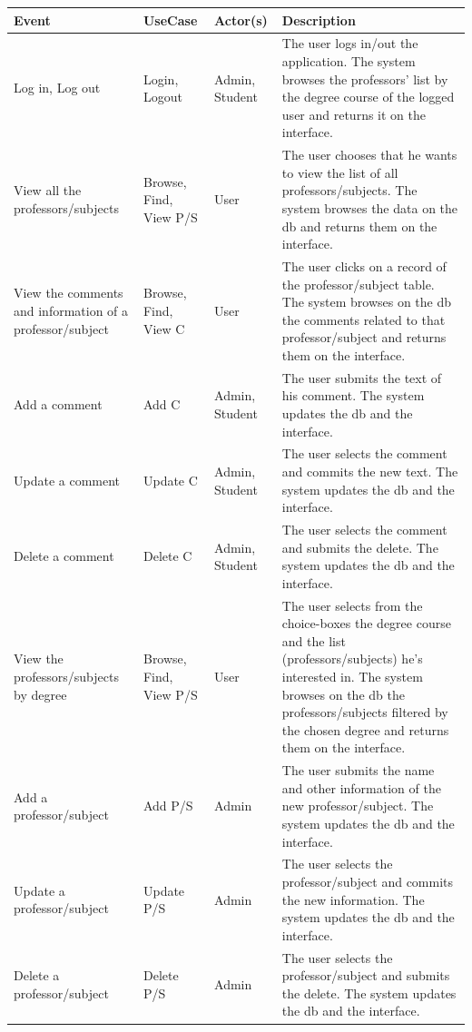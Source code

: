 \documentclass[a4paper, oneside]{article}
\begin{document}
\begin{table}[h]
\centering
\begin{tabular}{p{}p{}lp{}}
\hline
\textbf{Event} & \textbf{UseCase} & \textbf{Actor(s)} & \textbf{Description}\\ \hline
Log in, Log out & Login,  Logout & Admin, Student & The user logs in/out the application. The system browses the professors' list by the degree course of the logged user and returns it on the interface.\\ \hline
View all the professors/subjects & Browse, Find, View P/S & User & The user chooses that he wants to view the list of all professors/subjects. The system browses the data on the db and returns them on the interface.\\ \hline
View the comments and information of a professor/subject & Browse, Find, View C & User & The user clicks on a record of the professor/subject table. The system browses on the db the comments related to that professor/subject and returns them on the interface.\\ \hline
Add a comment & Add C & Admin, Student & The user submits the text of his comment. The system updates the db and the interface.\\ \hline
Update a comment & Update C & Admin, Student & The user selects the comment and commits the new text. The system updates the db and the interface.\\ \hline
Delete a comment & Delete C & Admin, Student & The user selects the comment and submits the delete. The system updates the db and the interface.\\ \hline
View the professors/subjects by degree & Browse, Find, View P/S & User & The user selects from the choice-boxes the degree course and the list (professors/subjects) he's interested in. The system browses on the db the professors/subjects filtered by the chosen degree and returns them on the interface.\\ \hline
Add a professor/subject & Add P/S & Admin & The user submits the name and other information of the new professor/subject. The system updates the db and the interface.\\ \hline
Update a professor/subject & Update P/S & Admin & The user selects the professor/subject and commits the new information. The system updates the db and the interface.\\ \hline
Delete a professor/subject & Delete P/S & Admin & The user selects the professor/subject and submits the delete. The system updates the db and the interface.\\ \hline
\end{tabular}
\end{table}
\end{document}
